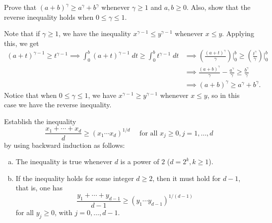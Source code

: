\documentclass[11pt,letterpaper]{article}
\begin{document}
\begin{cproblem}{38}
    Prove that $(a+b)^\gamma\geq a^\gamma + b^\gamma$ whenever $\gamma \geq 1$ and $a,b\geq 0$. Also, show that the reverse inequality holds when $0\leq \gamma\leq 1$.
\end{cproblem}

\begin{solution}
    Note that if $\gamma \geq 1$, we have the inequality $x^{\gamma-1}\leq y^{\gamma-1}$ whenever $x\leq y$. Applying this, we get
    \[
        \begin{aligned}
            (a+t)^{\gamma-1}\geq t^{\gamma-1} \implies \int^b_0 (a+t)^{\gamma-1}\;dt \geq \int^b_0 t^{\gamma-1} \;dt &\implies \left(\frac{(a+t)^\gamma}{\gamma}\right)\Bigg|^b_0 \geq \left(\frac{t^\gamma}{\gamma}\right)\Bigg|^b_0\\
            &\implies \frac{(a+b)^\gamma}{\gamma} - \frac{a^\gamma}{\gamma}\geq \frac{b^\gamma}{\gamma}\\
            &\implies (a+b)^\gamma \geq a^\gamma + b^\gamma.
        \end{aligned}
    \] 
    Notice that when $0\leq \gamma\leq 1$, we have $x^{\gamma-1}\geq y^{\gamma-1}$ whenever $x\leq y$, so in this case we have the reverse inequality.
\end{solution}

\begin{cproblem}{39}
    Establish the inequality
    \[
        \frac{x_1+\cdots+x_d}{d}\geq (x_1\cdots x_d)^{1 /d}\quad\textrm{ for all }x_j\geq 0, j = 1,\ldots,d
    \]
    by using backward induction as follows:
    \begin{enumerate}[(a)]  
        \item The inequality is true whenever $d$ is a power of $2$ ($d = 2^k, k \geq 1$).
        \item If the inequality holds for some integer $d\geq 2$, then it must hold for $d-1$, that is, one has \[\frac{y_1+\cdots+y_{d-1}}{d-1} \geq (y_1 \cdots y_{d-1})^{1 /(d-1)}\] for all $y_j\geq 0$, with $j=0,\ldots,d-1$.  
    \end{enumerate}
\end{cproblem}
\end{document}
